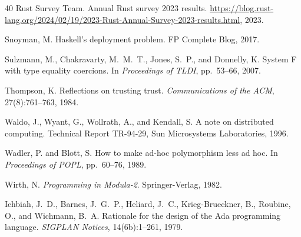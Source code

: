 \documentclass[11pt,twocolumn]{article}
\begin{document}
\begin{thebibliography}{40}
Rust Survey Team.
\newblock Annual Rust survey 2023 results.
\newblock \url{https://blog.rust-lang.org/2024/02/19/2023-Rust-Annual-Survey-2023-results.html}, 2023.

Snoyman, M.
\newblock Haskell's deployment problem.
\newblock FP Complete Blog, 2017.

Sulzmann, M., Chakravarty, M.~M.~T., Jones, S.~P., and Donnelly, K.
\newblock System F with type equality coercions.
\newblock In \emph{Proceedings of TLDI}, pp.~53--66, 2007.

Thompson, K.
\newblock Reflections on trusting trust.
\newblock \emph{Communications of the ACM}, 27(8):761--763, 1984.

Waldo, J., Wyant, G., Wollrath, A., and Kendall, S.
\newblock A note on distributed computing.
\newblock Technical Report TR-94-29, Sun Microsystems Laboratories, 1996.

Wadler, P. and Blott, S.
\newblock How to make ad-hoc polymorphism less ad hoc.
\newblock In \emph{Proceedings of POPL}, pp.~60--76, 1989.

Wirth, N.
\newblock \emph{Programming in Modula-2}.
\newblock Springer-Verlag, 1982.

Ichbiah, J.~D., Barnes, J.~G.~P., Heliard, J.~C., Krieg-Brueckner, B., Roubine, O., and Wichmann, B.~A.
\newblock Rationale for the design of the Ada programming language.
\newblock \emph{SIGPLAN Notices}, 14(6b):1--261, 1979.

\end{thebibliography}
\end{document}
